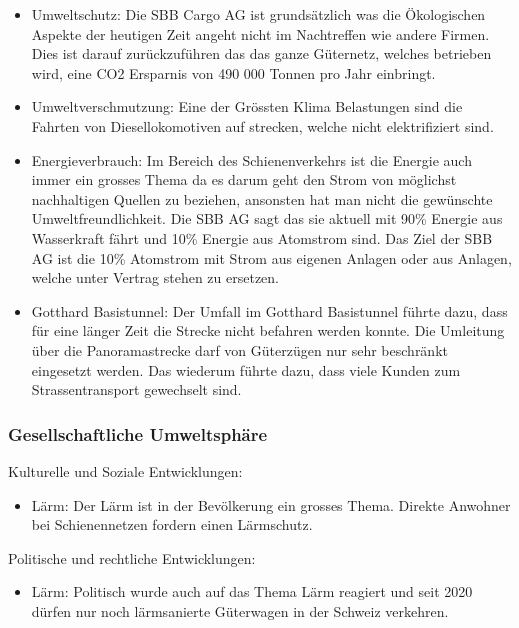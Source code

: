 \documentclass{article}
\begin{document}
\begin{itemize}
\item Umweltschutz:
Die SBB Cargo AG ist grundsätzlich was die Ökologischen Aspekte der heutigen Zeit angeht nicht im Nachtreffen wie andere Firmen.
Dies ist darauf zurückzuführen das das ganze Güternetz, welches betrieben wird, eine CO2 Ersparnis von 490 000 Tonnen pro Jahr einbringt.

\item Umweltverschmutzung:
Eine der Grössten Klima Belastungen sind die Fahrten von Diesellokomotiven auf strecken, welche nicht elektrifiziert sind.   

\item Energieverbrauch: Im Bereich des Schienenverkehrs ist die Energie auch immer ein grosses Thema da es darum geht den Strom von möglichst nachhaltigen Quellen zu beziehen, ansonsten hat man nicht die gewünschte Umweltfreundlichkeit. 
Die SBB AG sagt das sie aktuell mit 90\% Energie aus Wasserkraft fährt und 10\% Energie aus Atomstrom sind. Das Ziel der SBB AG ist die 10\% Atomstrom mit Strom aus eigenen Anlagen oder aus Anlagen, welche unter Vertrag stehen zu ersetzen.
\item Gotthard Basistunnel:
Der Umfall im Gotthard Basistunnel führte dazu, dass für eine länger Zeit die Strecke nicht befahren werden konnte.
Die Umleitung über die Panoramastrecke darf von Güterzügen nur sehr beschränkt eingesetzt werden.
Das wiederum führte dazu, dass viele Kunden zum Strassentransport gewechselt sind.
\end{itemize}

\subsubsection{Gesellschaftliche Umweltsphäre}

Kulturelle und Soziale Entwicklungen:
\begin{itemize}
\item Lärm: Der Lärm ist in der Bevölkerung ein grosses Thema. Direkte Anwohner bei Schienennetzen fordern einen Lärmschutz. 
\end{itemize}
Politische und rechtliche Entwicklungen:
\begin{itemize}
\item Lärm: Politisch wurde auch auf das Thema Lärm reagiert und seit 2020 dürfen nur noch lärmsanierte Güterwagen in der Schweiz verkehren.
\end{itemize}
\end{document}
